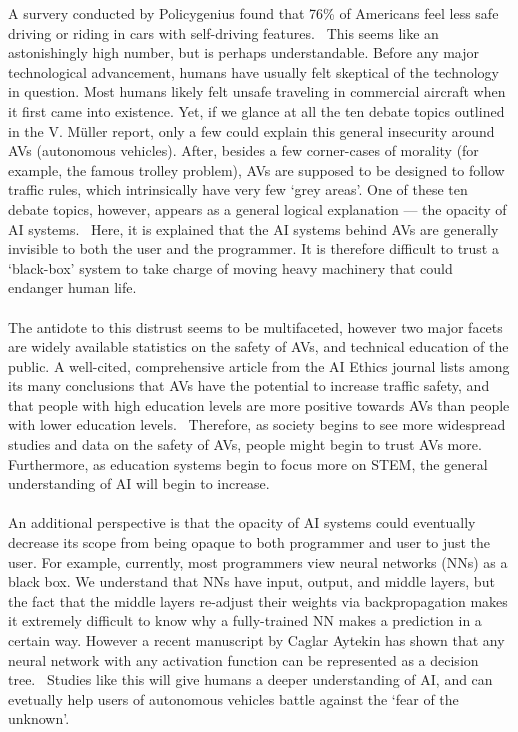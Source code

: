 \documentclass[12pt]{article}
\newcommand{\supercite}[1]{~{\textsuperscript{\cite{#1}}}}
\begin{document}
A survery conducted by Policygenius found that 76\% of Americans feel less
safe driving or riding in cars with self-driving features.\supercite{policy-genius-survey}
This seems like an astonishingly high number, but is perhaps understandable.
Before any major technological advancement, humans have usually felt skeptical
of the technology in question. Most humans likely felt unsafe traveling
in commercial aircraft when it first came into existence. Yet, if we glance at all the
ten debate topics outlined in the V. Müller report, only a few could explain 
this general insecurity around AVs (autonomous vehicles). After, besides a few
corner-cases of morality (for example, the famous trolley problem), AVs are
supposed to be designed to follow traffic rules, which intrinsically have 
very few `grey areas'. One of these ten debate topics, however, appears
as a general logical explanation --- the opacity of AI systems.\supercite{sep-ethics-ai}
Here, it is explained that the AI systems behind AVs are generally invisible
to both the user and the programmer. It is therefore difficult to trust a `black-box'
system to take charge of moving heavy machinery that could endanger human life.\\
\vspace{0in}\\
The antidote to this distrust seems to be multifaceted, however two major facets
are widely available statistics on the safety of AVs, and technical education of the public.
A well-cited, comprehensive article from the AI Ethics journal lists
among its many conclusions that AVs have the potential to increase traffic safety,
and that people with high education levels are more positive towards AVs
than people with lower education levels.\supercite{Othman2021-xr} Therefore,
as society begins to see more widespread studies and data on the safety of AVs,
people might begin to trust AVs more. Furthermore, as education systems begin
to focus more on STEM, the general understanding of AI will begin to increase.\\
\vspace{0in}\\
An additional perspective is that the opacity of AI systems could eventually
decrease its scope from being opaque to both programmer and user to just the user.
For example, currently, most programmers view neural networks (NNs) as a black box. We
understand that NNs have input, output, and middle layers, but the fact that the middle
layers re-adjust their weights via backpropagation makes it extremely difficult to
know why a fully-trained NN makes a prediction in a certain way. However a recent
manuscript by Caglar Aytekin has shown that any neural network with any activation
function can be represented as a decision tree.\supercite{caglar-nn-dt} Studies 
like this will give humans a deeper understanding of AI, and can evetually help
users of autonomous vehicles battle against the `fear of the unknown'.\\
\vspace{0in}\\
\lipsum[7]\\
\vspace{0in}\\
\lipsum[10]



\end{document}
